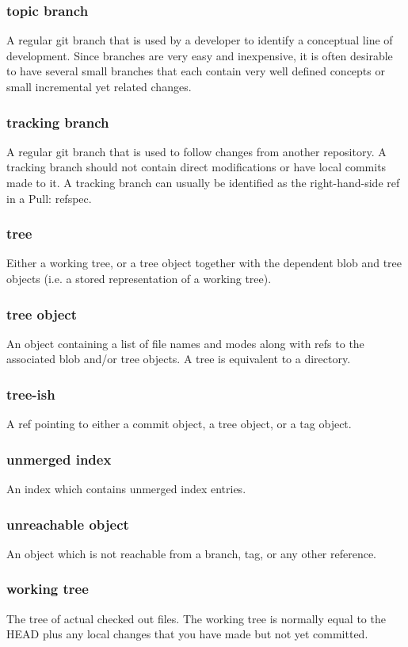 \subsubsection{topic branch}

A regular git branch that is used by a developer to identify a conceptual line of development. Since branches are very easy and inexpensive, it is often desirable to have several small branches that each contain very well defined concepts or small incremental yet related changes.

\subsubsection{tracking branch}

A regular git branch that is used to follow changes from another repository. A tracking branch should not contain direct modifications or have local commits made to it. A tracking branch can usually be identified as the right-hand-side ref in a Pull: refspec.

\subsubsection{tree}

Either a working tree, or a tree object together with the dependent blob and tree objects (i.e. a stored representation of a working tree).

\subsubsection{tree object}

An object containing a list of file names and modes along with refs to the associated blob and/or tree objects. A tree is equivalent to a directory.

\subsubsection{tree-ish}

A ref pointing to either a commit object, a tree object, or a tag object.

\subsubsection{unmerged index}

An index which contains unmerged index entries.

\subsubsection{unreachable object}

An object which is not reachable from a branch, tag, or any other reference.

\subsubsection{working tree}

The tree of actual checked out files. The working tree is normally equal to the HEAD plus any local changes that you have made but not yet committed.